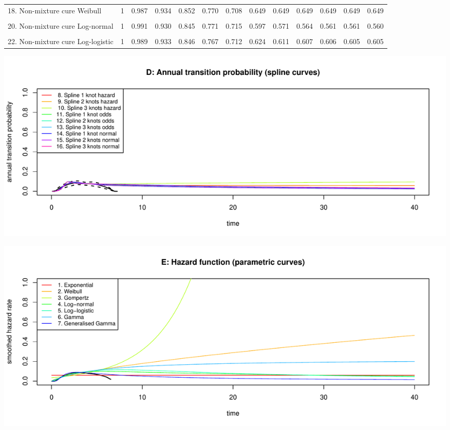 \documentclass[
]{article}
\begin{document}
\begin{table}
{\begin{tabular}[t]{lrrrrrrrrrrrr}
18. Non-mixture cure Weibull & 1 & 0.987 & 0.934 & 0.852 & 0.770 & 0.708 & 0.649 & 0.649 & 0.649 & 0.649 & 0.649 & 0.649\\
\cellcolor{gray!6}{19. Mixture cure Log-normal} & \cellcolor{gray!6}{1} & \cellcolor{gray!6}{0.991} & \cellcolor{gray!6}{0.930} & \cellcolor{gray!6}{0.845} & \cellcolor{gray!6}{0.771} & \cellcolor{gray!6}{0.715} & \cellcolor{gray!6}{0.600} & \cellcolor{gray!6}{0.578} & \cellcolor{gray!6}{0.573} & \cellcolor{gray!6}{0.572} & \cellcolor{gray!6}{0.571} & \cellcolor{gray!6}{0.571}\\
20. Non-mixture cure Log-normal & 1 & 0.991 & 0.930 & 0.845 & 0.771 & 0.715 & 0.597 & 0.571 & 0.564 & 0.561 & 0.561 & 0.560\\
\cellcolor{gray!6}{21. Mixture cure Log-logistic} & \cellcolor{gray!6}{1} & \cellcolor{gray!6}{0.989} & \cellcolor{gray!6}{0.933} & \cellcolor{gray!6}{0.846} & \cellcolor{gray!6}{0.767} & \cellcolor{gray!6}{0.712} & \cellcolor{gray!6}{0.624} & \cellcolor{gray!6}{0.610} & \cellcolor{gray!6}{0.607} & \cellcolor{gray!6}{0.605} & \cellcolor{gray!6}{0.604} & \cellcolor{gray!6}{0.604}\\
22. Non-mixture cure Log-logistic & 1 & 0.989 & 0.933 & 0.846 & 0.767 & 0.712 & 0.624 & 0.611 & 0.607 & 0.606 & 0.605 & 0.605\\
\bottomrule
\end{tabular}}
\end{table}

\begin{flushleft}\includegraphics[height=0.29\textheight]{Images/validate_extrapolation1-4} \end{flushleft}

\begin{flushleft}\includegraphics[height=0.29\textheight]{Images/validate_extrapolation1-5} \end{flushleft}
\end{document}
